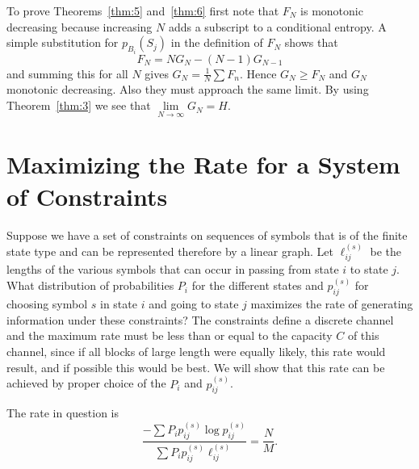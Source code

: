 To prove Theorems~\ref{thm:5} and~\ref{thm:6}
first note that $F_N$ is
monotonic decreasing because increasing $N$ adds a subscript to a
conditional entropy.  A simple substitution for
$p_{B_i}(S_j)$ in the
definition of $F_N$ shows that
$$
F_N=NG_N-(N-1)G_{N-1}
$$
and summing this for all $N$ gives $\displaystyle G_N=\frac 1N\sum F_n$.
Hence $G_N\geq F_N$ and $G_N$ monotonic decreasing.  Also they must approach
the same limit.  By using Theorem~\ref{thm:3} we see that
$\lim\limits_{N\to\infty}G_N=H$.

\section{Maximizing the Rate for a System of Constraints}
\label{ap:4}

Suppose we have a set of constraints on sequences of symbols that is of
the finite state type and can be represented therefore by a linear graph.
Let $\ell_{ij}^{(s)}$ be the lengths of the
various symbols that can occur in passing from state $i$ to state $j$.
What distribution of probabilities $P_i$ for the different states and
$p_{ij}^{(s)}$ for choosing symbol $s$ in state $i$ and going to state $j$
maximizes the rate of generating information under these constraints?
The constraints define a discrete channel and the maximum rate must be
less than or equal to the capacity $C$ of this channel, since if all
blocks of large length were equally likely, this rate would result,
and if possible this would be best.  We will show that this rate can be
achieved by proper choice of the $P_i$ and $p_{ij}^{(s)}$.

The rate in question is
$$
\frac{-\sum P_i p_{ij}^{(s)}\log p_{ij}^{(s)}}%
	{\sum P_{i} p_{ij}^{(s)} \ell_{ij}^{(s)}}
=\frac{N}{M}.
$$

